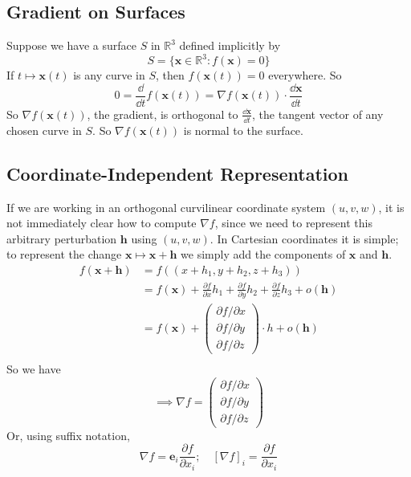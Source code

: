 \documentclass{article}
\begin{document}
\subsection{Gradient on Surfaces}
Suppose we have a surface $S$ in $\mathbb R^3$ defined implicitly by
\[ S = \{ \bm x \in \mathbb R^3 : f(\bm x) = 0 \} \]
If $t \mapsto \bm x(t)$ is any curve in $S$, then $f(\bm x(t)) = 0$ everywhere. So
\[ 0 = \frac{\dd}{\dd t}f(\bm x(t)) = \nabla f(\bm x(t)) \cdot \frac{\dd \bm x}{\dd t} \]
So $\nabla f(\bm x(t))$, the gradient, is orthogonal to $\frac{\dd \bm x}{\dd t}$, the tangent vector of any chosen curve in $S$. So $\nabla f(\bm x(t))$ is normal to the surface.

\subsection{Coordinate-Independent Representation}
If we are working in an orthogonal curvilinear coordinate system $(u, v, w)$, it is not immediately clear how to compute $\nabla f$, since we need to represent this arbitrary perturbation $\bm h$ using $(u, v, w)$. In Cartesian coordinates it is simple; to represent the change $\bm x \mapsto \bm x + \bm h$ we simply add the components of $\bm x$ and $\bm h$.
\begin{align*}
    f(\bm x + \bm h) & = f((x + h_1, y + h_2, z + h_3))                                                                                                  \\
                     & = f(\bm x) + \frac{\partial f}{\partial x} h_1 + \frac{\partial f}{\partial y} h_2 + \frac{\partial f}{\partial z} h_3 + o(\bm h) \\
                     & = f(\bm x) + \begin{pmatrix}
        \partial f / \partial x \\ \partial f / \partial y \\ \partial f / \partial z
    \end{pmatrix} \cdot h + o(\bm h)                                                                        \\
\end{align*}
So we have
\[ \implies \nabla f = \begin{pmatrix}
        \partial f / \partial x \\ \partial f / \partial y \\ \partial f / \partial z
    \end{pmatrix} \]
Or, using suffix notation,
\[ \nabla f = \bm e_i \frac{\partial f}{\partial x_i};\quad [\nabla f]_i = \frac{\partial f}{\partial x_i} \]
\end{document}
